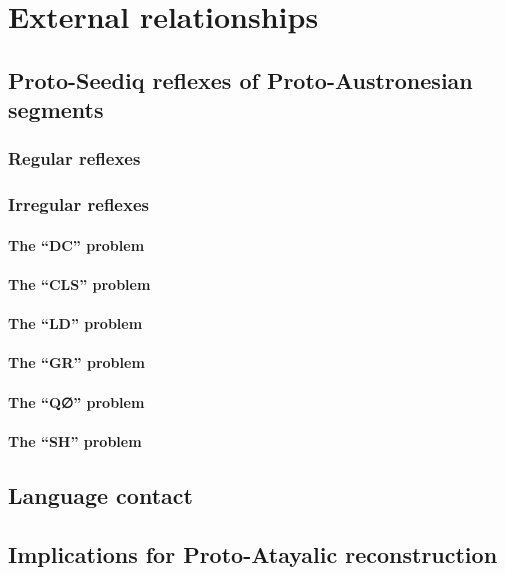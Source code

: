 \chapter{External relationships}\label{ch6}

\section{Proto-Seediq reflexes of Proto-Austronesian segments}
\lipsum[1]
\subsection{Regular reflexes}
\lipsum[1]
\subsection{Irregular reflexes}
\lipsum[1]
\subsubsection{The ``DC'' problem}
\lipsum[1]
\subsubsection{The ``CLS'' problem}
\lipsum[1]
\subsubsection{The ``LD'' problem}
\lipsum[1]
\subsubsection{The ``GR'' problem}
\lipsum[1]
\subsubsection{The ``Q∅'' problem}
\lipsum[1]
\subsubsection{The ``SH'' problem}
\lipsum[1]

\section{Language contact}
\lipsum[1]


\section{Implications for Proto-Atayalic reconstruction}
\lipsum[1]

